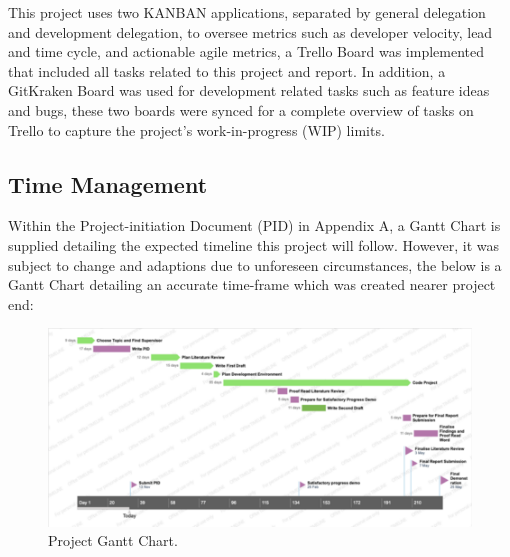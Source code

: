
This project uses two KANBAN applications, separated by general delegation and development delegation, to oversee metrics such as developer velocity, lead and time cycle, and actionable agile metrics, a Trello Board was implemented that included all tasks related to this project and report. In addition, a GitKraken Board was used for development related tasks such as feature ideas and bugs, these two boards were synced for a complete overview of tasks on Trello to capture the project’s work-in-progress (WIP) limits.


\subsection{Time Management}

Within the Project-initiation Document (PID) in Appendix A, a Gantt Chart is supplied detailing the expected timeline this project will follow. However, it was subject to change and adaptions due to unforeseen circumstances, the below is a Gantt Chart detailing an accurate time-frame which was created nearer project end:

\begin{figure}[H]
    \centering
    \includegraphics[width=\textwidth]{figures/chapter-3/ProjectGanttChart.pdf}
    \caption[Project Gantt Chart]{Project Gantt Chart.
    \label{fig:ProjectGanttChart}}
\end{figure}
